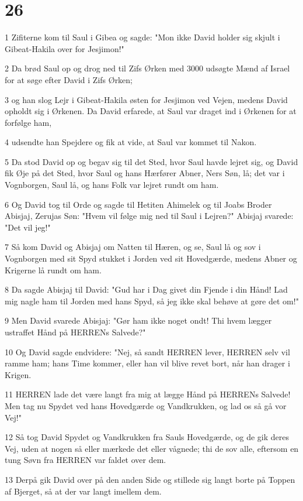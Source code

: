 \chapter{26}

\par 1 Zifiterne kom til Saul i Gibea og sagde: "Mon ikke David holder sig skjult i Gibeat-Hakila over for Jesjimon!"
\par 2 Da brød Saul op og drog ned til Zifs Ørken med 3000 udsøgte Mænd af Israel for at søge efter David i Zifs Ørken;
\par 3 og han slog Lejr i Gibeat-Hakila østen for Jesjimon ved Vejen, medens David opholdt sig i Ørkenen. Da David erfarede, at Saul var draget ind i Ørkenen for at forfølge ham,
\par 4 udsendte han Spejdere og fik at vide, at Saul var kommet til Nakon.
\par 5 Da stod David op og begav sig til det Sted, hvor Saul havde lejret sig, og David fik Øje på det Sted, hvor Saul og hans Hærfører Abner, Ners Søn, lå; det var i Vognborgen, Saul lå, og hans Folk var lejret rundt om ham.
\par 6 Og David tog til Orde og sagde til Hetiten Ahimelek og til Joabs Broder Abisjaj, Zerujas Søn: "Hvem vil følge mig ned til Saul i Lejren?" Abisjaj svarede: "Det vil jeg!"
\par 7 Så kom David og Abisjaj om Natten til Hæren, og se, Saul lå og sov i Vognborgen med sit Spyd stukket i Jorden ved sit Hovedgærde, medens Abner og Krigerne lå rundt om ham.
\par 8 Da sagde Abisjaj til David: "Gud har i Dag givet din Fjende i din Hånd! Lad mig nagle ham til Jorden med hans Spyd, så jeg ikke skal behøve at gøre det om!"
\par 9 Men David svarede Abisjaj: "Gør ham ikke noget ondt! Thi hvem lægger ustraffet Hånd på HERRENs Salvede?"
\par 10 Og David sagde endvidere: "Nej, så sandt HERREN lever, HERREN selv vil ramme ham; hans Time kommer, eller han vil blive revet bort, når han drager i Krigen.
\par 11 HERREN lade det være langt fra mig at lægge Hånd på HERRENs Salvede! Men tag nu Spydet ved hans Hovedgærde og Vandkrukken, og lad os så gå vor Vej!"
\par 12 Så tog David Spydet og Vandkrukken fra Sauls Hovedgærde, og de gik deres Vej, uden at nogen så eller mærkede det eller vågnede; thi de sov alle, eftersom en tung Søvn fra HERREN var faldet over dem.
\par 13 Derpå gik David over på den anden Side og stillede sig langt borte på Toppen af Bjerget, så at der var langt imellem dem.
